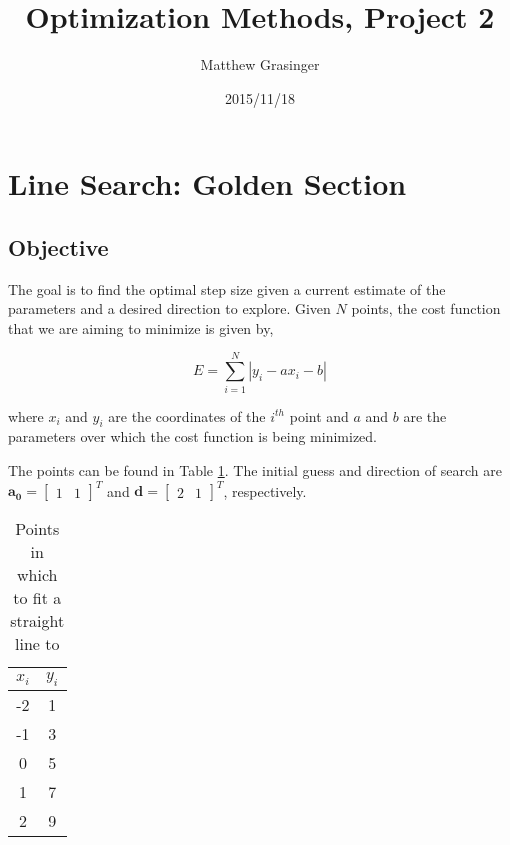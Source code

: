 \documentclass{article}
\title{Optimization Methods, Project 2}
\date{2015/11/18}
\author{Matthew Grasinger}
\begin{document}
	
	
\maketitle
\newpage
\tableofcontents
\newpage
{}

\section{Line Search: Golden Section}

\subsection{Objective}

The goal is to find the optimal step size given a current estimate of the parameters and a desired direction to explore.
Given $N$ points, the cost function that we are aiming to minimize is given by,

\begin{equation}
E = \sum_{i = 1}^{N} |y_i - a x_i - b|
\end{equation}

\noindent where $x_i$ and $y_i$ are the coordinates of the $i^{th}$ point and $a$ and $b$ are the parameters over which the cost function is being minimized.

The points can be found in Table \ref{table:points}.
The initial guess and direction of search are $\mathbf{a_0} = \begin{bmatrix} 1 & 1 \end{bmatrix}^T$ and $\mathbf{d} = \begin{bmatrix} 2 & 1 \end{bmatrix}^T$, respectively.

\begin{table}
\centering
\begin{tabular}{| c | c |}
	\hline
	$x_i$ & $y_i$ \\ \hline
	-2  & 1	  \\
	-1  & 3   \\
	0   & 5   \\
	1   & 7   \\
	2   & 9 \\
	\hline
\end{tabular}
\caption{Points in which to fit a straight line to}
\label{table:points}
\end{table}
\end{document}
